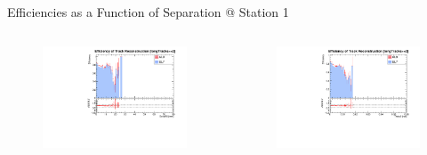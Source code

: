 
\begin{frame}{Efficiencies as a Function of Separation @ Station 1}
    \begin{columns}
        \begin{column}{0.6\linewidth}
            \begin{figure}
                \includegraphics[width=1\linewidth]{./output/Effi_greq2_DeltaR0.pdf}
            \end{figure}
        \end{column}
        \begin{column}{0.6\linewidth}
            \begin{figure}
                \includegraphics[width=1\linewidth]{./output/Effi_greq2_Theta0.pdf}
            \end{figure}
        \end{column}
    \end{columns}
\end{frame}

